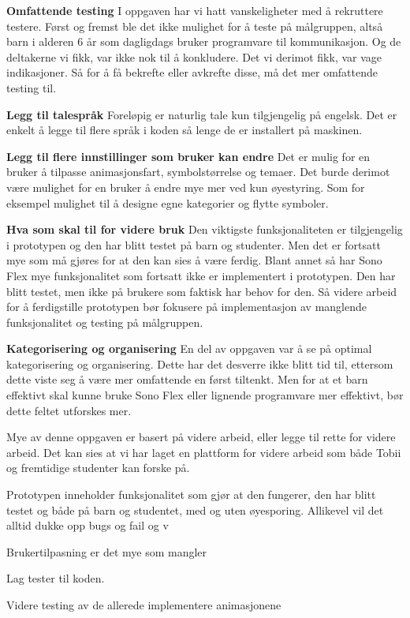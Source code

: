 \textbf{Omfattende testing}
I oppgaven har vi hatt vanskeligheter med å rekruttere testere. Først og fremst ble det ikke mulighet for å teste på målgruppen, altså barn i alderen 6 år som dagligdags bruker programvare til kommunikasjon. Og de deltakerne vi fikk, var ikke nok til å konkludere. Det vi derimot fikk, var vage indikasjoner. Så for å få bekrefte eller avkrefte disse, må det mer omfattende testing til. 

\textbf{Legg til talespråk}
Foreløpig er naturlig tale kun tilgjengelig på engelsk. Det er enkelt å legge til flere språk i koden så lenge de er installert på maskinen. 

\textbf{Legg til flere innstillinger som  bruker kan endre}
Det er mulig for en bruker å tilpasse animasjonsfart, symbolstørrelse og temaer. Det burde derimot være mulighet for en bruker å endre mye mer ved kun øyestyring. Som for eksempel mulighet til å designe egne kategorier og flytte symboler. 

\textbf{Hva som skal til for videre bruk} 
Den viktigste funksjonaliteten er tilgjengelig i prototypen og den har blitt testet på barn og studenter. Men det er fortsatt mye som må gjøres for at den kan sies å være ferdig. Blant annet så har Sono Flex mye funksjonalitet som fortsatt ikke er implementert i prototypen. Den har blitt testet, men ikke på brukere som faktisk har behov for den. Så videre arbeid for å ferdigstille prototypen bør fokusere på implementasjon av manglende funksjonalitet og testing på målgruppen.

\textbf{Kategorisering og organisering}
En del av oppgaven var å se på optimal kategorisering og organisering. Dette har det desverre ikke blitt tid til, ettersom dette viste seg å være mer omfattende en først tiltenkt. Men for at et barn effektivt skal kunne bruke Sono Flex eller lignende programvare mer effektivt, bør dette feltet utforskes mer.


Mye av denne oppgaven er basert på videre arbeid, eller legge til rette for videre arbeid. Det kan sies at vi har laget en plattform for videre arbeid som både Tobii og fremtidige studenter kan forske på.


Prototypen inneholder funksjonalitet som gjør at den fungerer, den har blitt testet og både på barn og studentet, med og uten øyesporing. Allikevel vil det alltid dukke opp bugs og fail og v

Brukertilpasning er det mye som mangler

Lag tester til koden. 

Videre testing av de allerede implementere animasjonene

